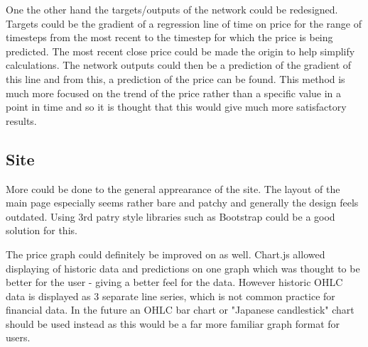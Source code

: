         One the other hand the targets/outputs of the network could be redesigned. Targets could be the gradient of a regression line of time on price for the range of timesteps from the most recent to the timestep for which the price is being predicted. The most recent close price could be made the origin to help simplify calculations. The network outputs could then be a prediction of the gradient of this line and from this, a prediction of the price can be found. This method is much more focused on the trend of the price rather than a specific value in a point in time and so it is thought that this would give much more satisfactory results.

        \subsection{Site}
        More could be done to the general apprearance of the site. The layout of the main page especially seems rather bare and patchy and generally the design feels outdated. Using 3rd patry style libraries such as Bootstrap could be a good solution for this.

        The price graph could definitely be improved on as well. Chart.js allowed displaying of historic data and predictions on one graph which was thought to be better for the user - giving a better feel for the data. However historic OHLC data is displayed as 3 separate line series, which is not common practice for financial data. In the future an OHLC bar chart or "Japanese candlestick" chart should be used instead as this would be a far more familiar graph format for users.
